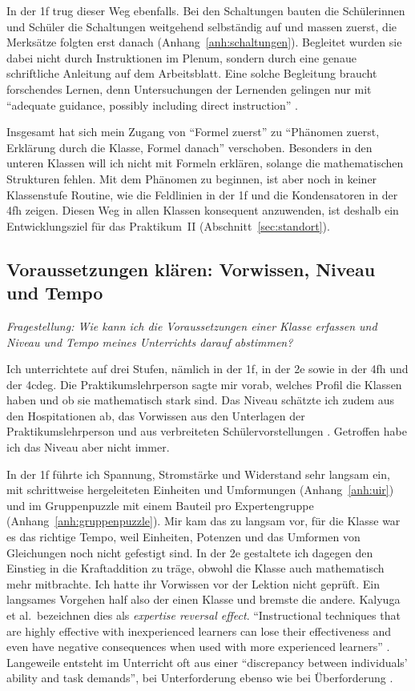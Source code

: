 \documentclass[12pt,a4paper]{article}
\begin{document}
In der 1f trug dieser Weg ebenfalls. Bei den Schaltungen bauten die
Schülerinnen und Schüler die Schaltungen weitgehend selbständig auf und massen
zuerst, die Merksätze folgten erst danach (Anhang~\ref{anh:schaltungen}).
Begleitet wurden sie dabei nicht durch Instruktionen im Plenum, sondern durch
eine genaue schriftliche Anleitung auf dem Arbeitsblatt. Eine solche
Begleitung braucht forschendes Lernen, denn Untersuchungen der Lernenden
gelingen nur mit \enquote{adequate guidance, possibly including direct
instruction} \parencite[5]{dejong2023}.

Insgesamt hat sich mein Zugang von \enquote{Formel zuerst} zu
\enquote{Phänomen zuerst, Erklärung durch die Klasse, Formel danach}
verschoben. Besonders in den unteren Klassen will ich nicht mit
Formeln erklären, solange die mathematischen Strukturen fehlen. Mit dem
Phänomen zu beginnen, ist aber noch in keiner Klassenstufe Routine, wie die
Feldlinien in der 1f und die Kondensatoren in der 4fh zeigen. Diesen Weg in
allen Klassen konsequent anzuwenden, ist
deshalb ein Entwicklungsziel für das Praktikum~II
(Abschnitt~\ref{sec:standort}).

\subsection{Voraussetzungen klären: Vorwissen, Niveau und Tempo}
\label{sec:schwerpunkt2}

\noindent\textit{Fragestellung: Wie kann ich die Voraussetzungen einer Klasse
erfassen und Niveau und Tempo meines Unterrichts darauf abstimmen?}

Ich unterrichtete auf drei Stufen, nämlich in der 1f, in der 2e sowie in der 4fh und
der 4cdeg. Die Praktikumslehrperson sagte mir vorab, welches Profil die
Klassen haben und ob sie mathematisch stark sind. Das Niveau schätzte ich
zudem aus den Hospitationen ab, das Vorwissen aus den Unterlagen der
Praktikumslehrperson und aus verbreiteten Schülervorstellungen
\parencite{schecker2018}. Getroffen habe ich das Niveau aber nicht immer.

In der 1f führte ich Spannung, Stromstärke und Widerstand sehr langsam ein,
mit schrittweise hergeleiteten Einheiten und Umformungen
(Anhang~\ref{anh:uir}) und im Gruppenpuzzle mit einem Bauteil pro
Expertengruppe (Anhang~\ref{anh:gruppenpuzzle}). Mir kam das zu langsam vor, für die Klasse
war es das richtige Tempo, weil Einheiten, Potenzen und das Umformen von
Gleichungen noch nicht gefestigt sind. In der 2e gestaltete ich dagegen den
Einstieg in die Kraftaddition zu träge, obwohl die Klasse auch mathematisch
mehr mitbrachte. Ich hatte ihr Vorwissen vor der Lektion nicht geprüft. Ein
langsames Vorgehen half also der einen Klasse und bremste die andere. Kalyuga
et al.\ bezeichnen dies als \textit{expertise reversal effect}.
\enquote{Instructional techniques that are highly effective with inexperienced
learners can lose their effectiveness and even have negative consequences when
used with more experienced learners} \parencite[23]{kalyuga2003}. Langeweile
entsteht im Unterricht oft aus einer \enquote{discrepancy between individuals'
ability and task demands}, bei Unterforderung ebenso wie bei Überforderung
\parencite[208]{krannich2019}.
\end{document}
